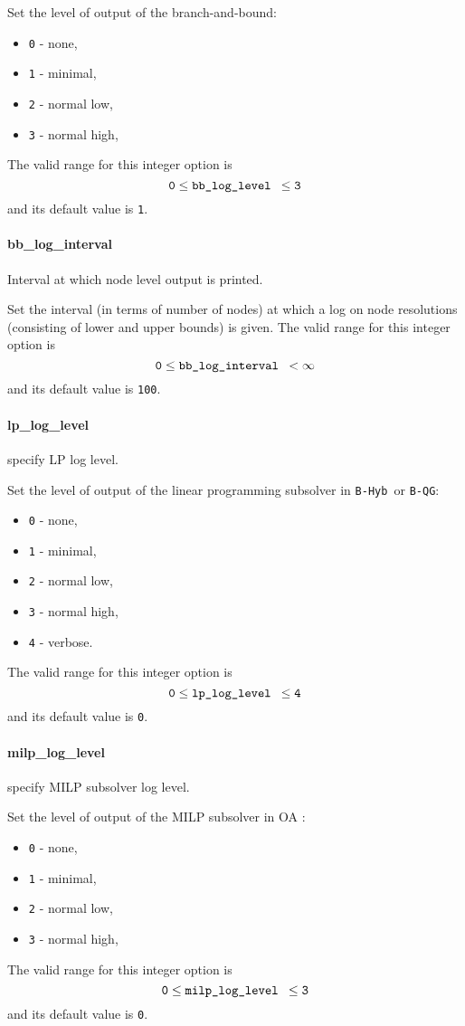  Set the level of output of the branch-and-bound:
 \begin{itemize}
  \item {\tt 0} - none,
  \item {\tt 1} - minimal,
  \item {\tt 2} - normal low,
  \item {\tt 3} - normal high,
  \end{itemize}
 The valid range for this integer option is
 $${\tt 0} \le \hbox{\tt bb\_log\_level } \le {\tt 3}$$
and its default value is {\tt 1}.


\paragraph{bb\_log\_interval} 
\label{bb_log_interval}
Interval at which node level output is printed.

 Set the interval (in terms of number of nodes) at
which a log on node resolutions (consisting of
lower and upper bounds) is given. The valid range for this integer option is
$${\tt 0} \le \hbox{\tt bb\_log\_interval } <  \infty$$
and its default value is {\tt 100}.


\paragraph{lp\_log\_level}
\label{lp_log_level}
 specify LP log level.

 Set the level of output of the linear programming
subsolver in {\tt B-Hyb }or {\tt B-QG}:
 \begin{itemize}
  \item {\tt 0} - none,
  \item {\tt 1} - minimal,
  \item {\tt 2} - normal low,
  \item {\tt 3} - normal high,
  \item {\tt 4} - verbose.
  \end{itemize}
The valid range for this integer option is
$${\tt 0} \le \hbox{\tt lp\_log\_level } \le {\tt 4}$$
and its default value is {\tt 0}.


\paragraph{milp\_log\_level} 
\label{milp_log_level}
specify MILP subsolver log level.

 Set the level of output of the MILP subsolver in
OA :
 \begin{itemize}
  \item {\tt 0} - none,
  \item {\tt 1} - minimal,
  \item {\tt 2} - normal low,
  \item {\tt 3} - normal high,
  \end{itemize}
The valid range for this integer option is
$${\tt 0} \le \hbox{\tt milp\_log\_level } \le {\tt 3}$$
and its default value is {\tt 0}.


